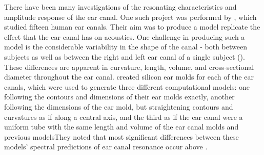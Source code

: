 There have been many investigations of the resonating characteristics and amplitude response of the ear canal.  One such project was performed by \cite{stinson:89}, which studied fifteen human ear canals.  Their aim was to produce a model \DIFdelbegin {}\DIFdelend \DIFaddbegin {}\DIFaddend replicate the effect that the ear canal has on acoustics.
One challenge in producing such a model is the considerable variability in the shape of the canal - both between subjects as well as between the right and left ear canal of a single subject (\cite{stinson:89}).  These differences are apparent in curvature, length, volume, and cross-sectional diameter throughout the ear canal.  \cite{stinson:89} created silicon ear molds for each of the ear canals, which were used to generate three different computational models: one following the contours and dimensions of their ear molds exactly, another following the dimensions of the ear mold, but straightening contours and curvatures as if along a central axis, and the third as if the ear canal were a uniform tube with the same length and volume of the ear canal molds and previous models\DIFdelbegin {}\DIFdelend \DIFaddbegin {}\DIFaddend They noted that most significant differences between these models' spectral predictions of ear canal resonance occur above \DIFdelbegin {}\DIFdelend \DIFaddbegin {}\DIFaddend .

\DIFdelbegin %
{%
}
\DIFdelend %

